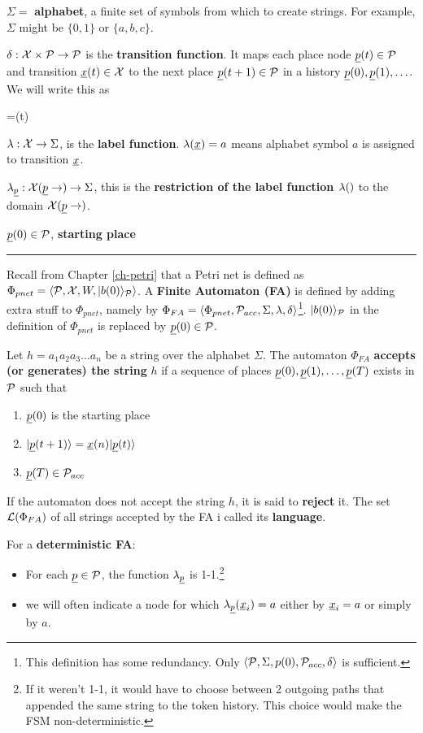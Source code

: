 $\Sigma=$ {\bf alphabet}, a finite set of symbols
from which to create strings. For example,
$\Sigma$ might be $\{0, 1\}$ or $\{a, b, c\}$.

$\delta:{\cal X}\times{\cal P}\rightarrow {\cal P}$ is the 
{\bf transition function}. It maps each place node $\rvp(t)\in\calp$ and transition $\rvx(t)\in\calx$ to the next place $\rvp(t+1)\in\calp$ in a history $\rvp(0), \rvp(1), \ldots$. We will write this as

\beq
{}=\rvx(t)
\eeq


$\lambda:{\cal X}\rightarrow\Sigma$, is the {\bf label function}. $\lam(\rvx)=a$ means alphabet symbol $a$ is assigned to transition $\rvx$.  


$\lam_\rvp:\calx(\rvp\rarrow)\rarrow\Sigma$, this is the {\bf restriction of the label function $\lambda()$}
to the domain $\calx(\rvp\rarrow)$.


$\rvp(0)\in \calp$, {\bf starting place }
\hrule
Recall from Chapter \ref{ch-petri} that a Petri net is defined as $\Phi_{pnet} = \left\langle{\cal P}, {\cal X}, W,|b(0)\rangle_{\cal P}\right\rangle$.
A {\bf Finite Automaton (FA)}
is defined by adding extra stuff to
$\Phi_{pnet}$, namely by
$\Phi_{FA}=\left\langle\Phi_{pnet},{\cal P}_{acc}, \Sigma, \lambda, \delta\right\rangle$\footnote{This definition has some redundancy. Only 
$\left\langle{\cal P}, \Sigma, p(0), {\cal P}_{acc}, \delta\right\rangle$
is sufficient.}.
$|b(0)\rangle_{\cal P}$ in the definition
of $\Phi_{pnet}$ is replaced by
$\rvp(0)\in\calp$.

Let $h=a_1a_2a_3\ldots a_n$ be a string
over the alphabet $\Sigma$.
The automaton $\Phi_{FA}$ {\bf accepts (or generates) the string} $h$
if a sequence of places $\rvp(0), \rvp(1), \ldots, \rvp(T)$ exists
in ${\cal P}$ such that 
\begin{enumerate}
\item $\rvp(0)$  is the starting place
\item $\ket{\rvp(t+1) }= \rvx(n)\ket{\rvp(t)}$
\item $\rvp(T)\in \calp_{acc}$
\end{enumerate}
If the automaton does not accept the string $h$,
it is said to {\bf reject} it. The set ${\cal L}(\Phi_{FA})$ of all strings 
accepted by the FA i called its {\bf language}.

\begin{mdframed}[hidealllines=true,backgroundcolor=blue!10]
For a {\bf deterministic FA}:
\begin{itemize}
\item For each $\rvp\in\calp$, the function  $\lam_\rvp$ is 1-1.\footnote{If it weren't 1-1,
it would have to choose 
between 2 outgoing paths
that appended the same string to the token history.
This choice would make
the FSM non-deterministic.}

\item
we will often indicate a node for 
which $\lam_{\rvp}(\rvx_i)=a$ either by $\rvx_i=a$
or simply by $a$. 
\end{itemize}\end{mdframed}

